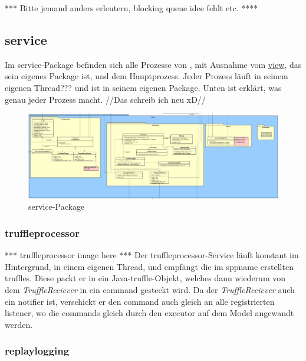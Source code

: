       *** Bitte jemand anders erleutern, blocking queue idee fehlt etc. ****


\subsection{service}
\label{subsec:service}

Im service-Package befinden sich alle Prozesse von \programname,
mit Ausnahme vom \hyperref[subsec:view]{view}, das sein eigenes Package ist, und dem
Hauptprozess. Jeder Prozess läuft in seinem eigenen Thread??? und ist in seinem
eigenen Package. Unten ist erklärt, was genau jeder Prozess macht.
//Das schreib ich neu xD//

\begin{figure}[H]
  \centering
  \includegraphics[width=\textwidth]{../diagramimages/service.png}
  \caption{service-Package}
  \medskip
\end{figure}

    \subsubsection{truffleprocessor}
    \label{subsubsec:truffleprocessor}

    *** truffleprocessor image here ***
    \newline
    \newline
    Der truffleprocessor-Service läuft konstant im Hintergrund, in einem eigenen Thread,
    und empfängt die im \gls{sppname} erstellten \glspl{truffle}.
    Diese packt er in ein Java-\gls{truffle}-Objekt, welches dann wiederum von dem
    \textit{TruffleReciever} in ein \gls{command} gesteckt wird. Da der \textit{TruffleReciever}
    auch ein \gls{notifier} ist, verschickt er den \gls{command} auch gleich an
    alle registrierten \gls{listener}, wo die \glspl{command} gleich durch den
    \gls{executor} auf dem Model angewandt werden.

    \subsubsection{replaylogging}
    \label{subsubsec:replaylogging}

